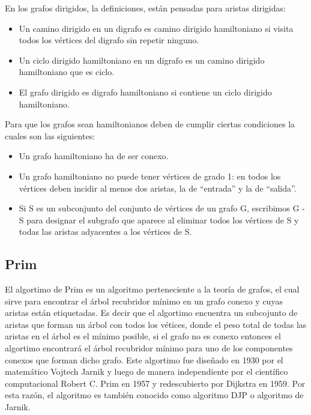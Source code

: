 \documentclass[10pt,a4paper]{article}
\begin{document}
En los grafos dirigidos, la definiciones, están pensadas para aristas dirigidas:
\begin{itemize}
\item Un camino dirigido en un digrafo es camino dirigido hamiltoniano si visita todos los vértices del digrafo sin repetir ninguno.
\item Un ciclo dirigido hamiltoniano en un digrafo es un camino dirigido hamiltoniano que es ciclo.
\item El grafo dirigido es digrafo hamiltoniano si contiene un ciclo dirigido hamiltoniano.
\end{itemize}		

  
Para que los grafos sean hamiltonianos deben de cumplir ciertas condiciones la cuales son las siguientes:
\begin{itemize}
\item Un grafo hamiltoniano ha de ser conexo.
\item Un grafo hamiltoniano no puede tener vértices de grado 1: en todos los vértices deben incidir al menos dos aristas, la de “entrada” y la de “salida”.
\item Si S es un subconjunto del conjunto de vértices de un grafo G, escribimos G - S para designar el subgrafo que aparece al eliminar todos los vértices de S y todas las aristas adyacentes a los vértices de S.
\end{itemize}
\subsection{Prim}
	El algortimo de Prim es un algoritmo perteneciente a la teoría de grafos, el cual sirve para encontrar el árbol recubridor mínimo en un grafo conexo y cuyas aristas están etiquetadas. Es decir que el algortimo encuentra un subcojunto de aristas que forman un árbol con todos los vétices, donde el peso total de todas las aristas en el árbol es el mínimo posible, si el grafo no es conexo  entonces el algortimo encontrará el árbol recubridor mínimo para uno de los componentes conexos que forman dicho grafo. Este algortimo fue diseñado en 1930 por el matemático  Vojtech Jarnik y luego de manera independiente por el científico computacional Robert C. Prim en 1957 y redescubierto por Dijkstra en 1959. Por esta razón, el algoritmo es también conocido como algoritmo DJP o algoritmo de Jarnik.\cite{Prim}\\
	
\end{document}

